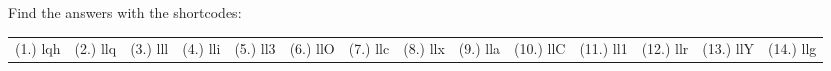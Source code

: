     
  \label{m39373**end}
          
       
    
  \label{0bb9905f9f275884255abbf74a951a4a**end}
    
\par {} Find the answers with the shortcodes:
 \par \begin{tabular}[h]{cccccc}
 (1.) lqh  &  (2.) llq  &  (3.) lll  &  (4.) lli  &  (5.) ll3  &  (6.) llO  &  (7.) llc  &  (8.) llx  &  (9.) lla  &  (10.) llC  &  (11.) ll1  &  (12.) llr  &  (13.) llY  &  (14.) llg  & \end{tabular}



